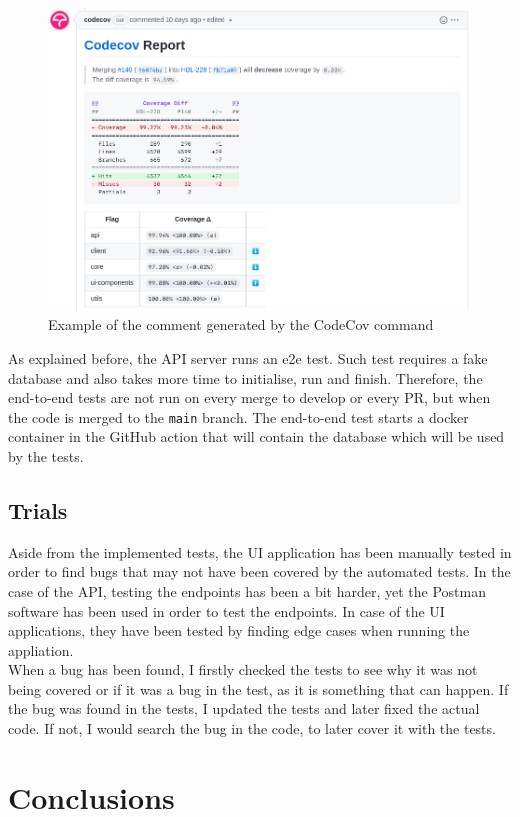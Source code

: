 \documentclass[a4paper, 12pt, oneside]{book}
\begin{document}
\begin{figure}[H]
	\centering
	\includegraphics[width=\textwidth]{assets/codecov-example.png}
	\caption{Example of the comment generated by the CodeCov command}
\end{figure}
As explained before, the API server runs an e2e test. Such test requires a fake database and also takes more time to initialise, run and finish. Therefore, the end-to-end tests are not run on every merge to develop or every PR, but when the code is merged to the \texttt{main} branch. The end-to-end test starts a docker container in the GitHub action that will contain the database which will be used by the tests.
\section{Trials}
Aside from the implemented tests, the UI application has been manually tested in order to find bugs that may not have been covered by the automated tests. In the case of the API, testing the endpoints has been a bit harder, yet the Postman software has been used in order to test the endpoints. In case of the UI applications, they have been tested by finding edge cases when running the appliation.
\\[8pt]
When a bug has been found, I firstly checked the tests to see why it was not being covered or if it was a bug in the test, as it is something that can happen. If the bug was found in the tests, I updated the tests and later fixed the actual code. If not, I would search the bug in the code, to later cover it with the tests. 
\chapter{Conclusions}
\end{document}
